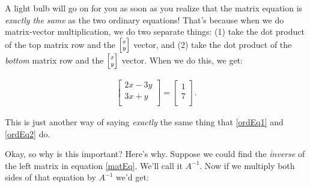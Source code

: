 
A light bulb will go on for you as soon as you realize that the matrix equation
is \textit{exactly the same} as the two ordinary equations! That's because when
we do matrix-vector multiplication, we do two separate things: (1) take the dot
product of the top matrix row and the ${\scriptsize \begin{bmatrix} x \\ y
\end{bmatrix}}$ vector, and (2) take the dot product of the \textit{bottom}
matrix row and the ${\scriptsize \begin{bmatrix} x \\ y \end{bmatrix}}$ vector.
When we do this, we get:

\vspace{-.15in}
\begin{align*}
\begin{bmatrix}
2x - 3y \\
3x + y \\
\end{bmatrix} =
\begin{bmatrix}
1 \\ 7 \\
\end{bmatrix}.
\end{align*}
\vspace{-.15in}

This is just another way of saying \textit{exactly} the same thing that
\ref{ordEq1} and \ref{ordEq2} do.

\smallskip

Okay, so why is this important? Here's why. Suppose we could find the
\textit{inverse} of the left matrix in equation \ref{matEq}. We'll call it
$A^{-1}$. Now if we multiply both sides of that equation by $A^{-1}$ we'd get:

